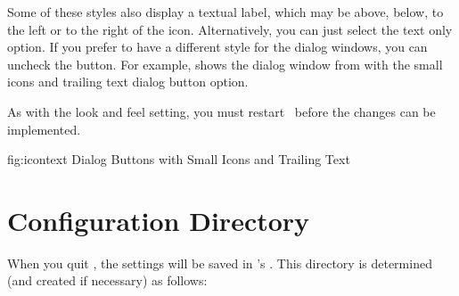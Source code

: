 Some of these styles also display a textual label, which may be
above, below, to the left or to the right of the icon.
Alternatively, you can just select the text only option. If you
prefer to have a different style for the dialog windows, you can
uncheck the  button. 
For example,  shows the
dialog window from  with the
small icons and trailing text dialog button option.

As with the look and feel setting, you must restart \FlowframTk\
before the changes can be implemented.

\FloatFig
  {fig:icontext}
  {}
  {Dialog Buttons with Small Icons and Trailing Text}


\section{Configuration Directory}\label{sec:configdir}


When you quit \FlowframTk, the settings will be saved in
\FlowframTk's .  This directory is
determined (and created if necessary) as follows:

